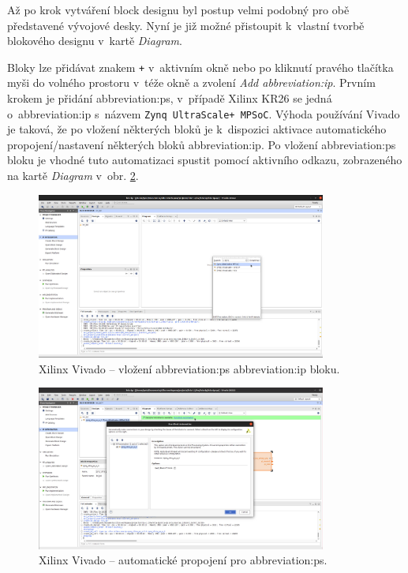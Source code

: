 \documentclass[a4paper, twoside, 11pt]{article}
\newcommand{\fbar}{\FloatBarrier}
\begin{document}
				Až po krok vytváření block designu byl postup velmi podobný pro obě představené vývojové desky. Nyní je již možné přistoupit k~vlastní tvorbě blokového designu v~kartě \textit{Diagram}.\par
				Bloky lze přidávat znakem \texttt{+} v~aktivním okně nebo po kliknutí pravého tlačítka myši do volného prostoru v~téže okně a zvolení \textit{Add \gls{abbreviation:ip}}. Prvním krokem je přidání \gls{abbreviation:ps}, v~případě Xilinx KR26 se jedná o~\gls{abbreviation:ip} s~názvem \texttt{Zynq UltraScale+ MPSoC}. Výhoda používání Vivado je taková, že po vložení některých bloků je k~dispozici aktivace automatického propojení/nastavení některých bloků \gls{abbreviation:ip}. Po vložení \gls{abbreviation:ps} bloku je vhodné tuto automatizaci spustit pomocí aktivního odkazu, zobrazeného na kartě \textit{Diagram} v~obr. \ref{fig:kr26-xilix-vivado-flow-05}.

				\begin{figure}[htbp!]
					\centering
					\includegraphics[width=0.85\textwidth]{src/png/kr26-xilinx-vivado-flow/kr26-xilix-vivado-flow-04.jpg}
					\caption{Xilinx Vivado – vložení \gls{abbreviation:ps} \gls{abbreviation:ip} bloku.}
					\label{fig:kr26-xilix-vivado-flow-04}
				\end{figure}

				\begin{figure}[htbp!]
					\centering
					\includegraphics[width=0.85\textwidth]{src/png/kr26-xilinx-vivado-flow/kr26-xilix-vivado-flow-05.jpg}
					\caption{Xilinx Vivado – automatické propojení pro \gls{abbreviation:ps}.}
					\label{fig:kr26-xilix-vivado-flow-05}
				\end{figure}
				\fbar
\end{document}
